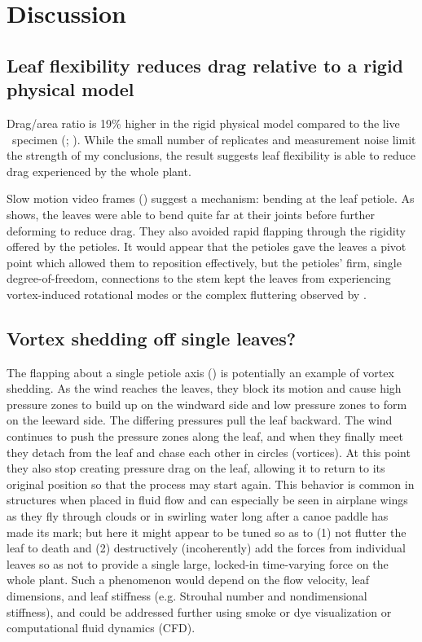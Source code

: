 \section{Discussion}
\label{sec:discussion}

\subsection{Leaf flexibility reduces drag relative to a rigid physical model}
Drag/area ratio is 19\% higher in the rigid physical model compared to the live \Cxparadisi\ specimen (; ). While the small number of replicates and measurement noise limit the strength of my conclusions, the result suggests leaf flexibility is able to reduce drag experienced by the whole plant. 

Slow motion video frames () suggest a mechanism: bending at the leaf petiole. As  shows, the leaves were able to bend quite far at their joints before further deforming to reduce drag. They also avoided rapid flapping through the rigidity offered by the petioles. It would appear that the petioles gave the leaves a pivot point which allowed them to reposition effectively, but the petioles' firm, single degree-of-freedom, connections to the stem kept the leaves from experiencing vortex-induced rotational modes or the complex fluttering observed by \citet{miller2012reconfiguration}. 

\subsection{Vortex shedding off single leaves?}
The flapping about a single petiole axis () is potentially an example of vortex shedding. As the wind reaches the leaves, they block its motion and cause high pressure zones to build up on the windward side and low pressure zones to form on the leeward side. The differing pressures pull the leaf backward. The wind continues to push the pressure zones along the leaf, and when they finally meet they detach from the leaf and chase each other in circles (vortices). At this point they also stop creating pressure drag on the leaf, allowing it to return to its original position so that the process may start again. This behavior is common in structures when placed in fluid flow and can especially be seen in airplane wings as they fly through clouds or in swirling water long after a canoe paddle has made its mark; but here it might appear to be tuned so as to (1) not flutter the leaf to death and (2) destructively (incoherently) add the forces from individual leaves so as not to provide a single large, locked-in time-varying force on the whole plant. Such a phenomenon would depend on the flow velocity, leaf dimensions, and leaf stiffness (e.g. Strouhal number and nondimensional stiffness), and could be addressed further using smoke or dye visualization or computational fluid dynamics (CFD). 

